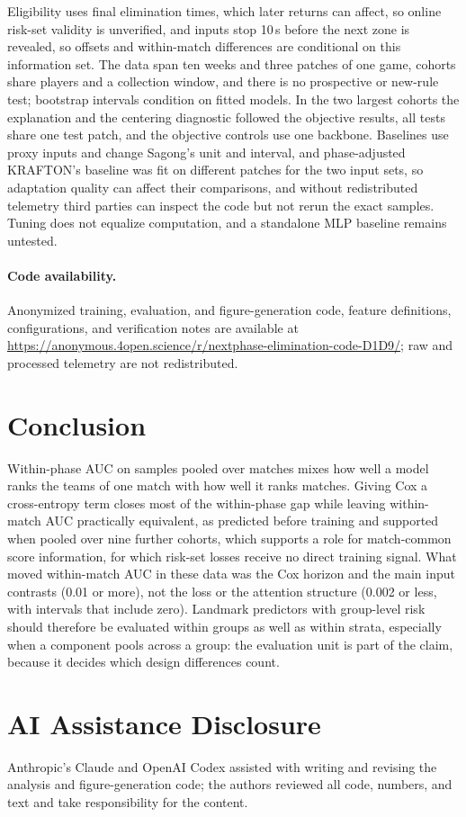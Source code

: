 \documentclass[sigconf,anonymous]{acmart}
\newcommand{\artifacturl}{\url{https://anonymous.4open.science/r/nextphase-elimination-code-D1D9/}}
\begin{document}
Eligibility uses final elimination times, which later returns can affect, so online risk-set validity is unverified, and inputs stop 10\,s before the next zone is revealed, so offsets and within-match differences are conditional on this information set. The data span ten weeks and three patches of one game, cohorts share players and a collection window, and there is no prospective or new-rule test; bootstrap intervals condition on fitted models. In the two largest cohorts the explanation and the centering diagnostic followed the objective results, all tests share one test patch, and the objective controls use one backbone. Baselines use proxy inputs and change Sagong's unit and interval, and phase-adjusted KRAFTON's baseline was fit on different patches for the two input sets, so adaptation quality can affect their comparisons, and without redistributed telemetry third parties can inspect the code but not rerun the exact samples. Tuning does not equalize computation, and a standalone MLP baseline remains untested.

\paragraph{Code availability.}
Anonymized training, evaluation, and figure-generation code, feature definitions, configurations, and verification notes are available at \artifacturl{}; raw and processed telemetry are not redistributed.

\section{Conclusion}
\label{sec:conclusion}
Within-phase AUC on samples pooled over matches mixes how well a model ranks the teams of one match with how well it ranks matches. Giving Cox a cross-entropy term closes most of the within-phase gap while leaving within-match AUC practically equivalent, as predicted before training and supported when pooled over nine further cohorts, which supports a role for match-common score information, for which risk-set losses receive no direct training signal. What moved within-match AUC in these data was the Cox horizon and the main input contrasts (0.01 or more), not the loss or the attention structure (0.002 or less, with intervals that include zero). Landmark predictors with group-level risk should therefore be evaluated within groups as well as within strata, especially when a component pools across a group: the evaluation unit is part of the claim, because it decides which design differences count.

\section*{AI Assistance Disclosure}
Anthropic's Claude and OpenAI Codex assisted with writing and revising the analysis and figure-generation code; the authors reviewed all code, numbers, and text and take responsibility for the content.



\end{document}
